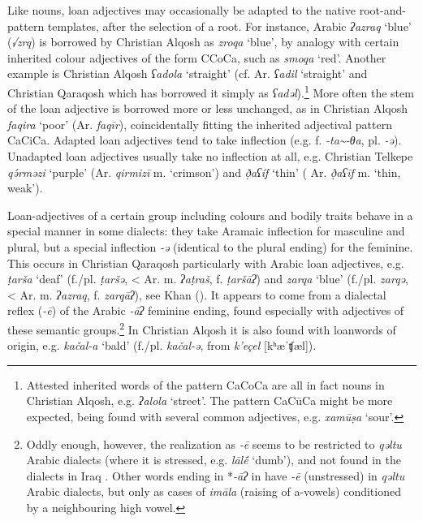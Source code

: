 \documentclass[output=paper]{langsci/langscibook}
\begin{document}
Like nouns, loan adjectives may occasionally be adapted to the native {root-and-pattern} templates, after the selection of a {root}. For instance, Arabic \textit{ʔazraq} ‘blue’ (\textit{√zrq}) is borrowed by Christian Alqosh as \textit{zroqa} ‘blue’, by {analogy} with certain inherited colour adjectives of the form CCoCa, such as \textit{smoqa} ‘red’. Another example is Christian Alqosh \textit{ʕadola} ‘straight’ (cf.  Ar. \textit{ʕadil} ‘straight’ and Christian Qaraqosh which has borrowed it simply as \textit{ʕadəl}).\footnote{Attested inherited words of the pattern CaCoCa are all in fact nouns in Christian Alqosh, e.g. \textit{ʔalola} ‘street’. The pattern CaCūCa might be more expected, being found with several common adjectives, e.g. \textit{xamūṣa} ‘sour’.} More often the {stem} of the loan adjective is borrowed more or less unchanged, as in Christian Alqosh \textit{faqira} ‘poor’ (Ar. \textit{faqīr}), coincidentally fitting the inherited adjectival pattern CaCiCa. Adapted loan adjectives tend to take  {inflection} (e.g. f. \textit{{}-ta{\textasciitilde}-θa}, pl. \textit{{}-ə}). Unadapted loan adjectives usually take no {inflection} at all, e.g. Christian Telkepe \textit{qə́rməzi} ‘purple’ (Ar. \textit{qirmizī} m. ‘crimson’) and \textit{ð̣aʕíf} ‘thin’ ( Ar. \textit{ð̣aʕīf} m. ‘thin, weak’).

Loan-adjectives of a certain group including colours and bodily traits behave in a special manner in some  dialects: they take Aramaic {inflection} for masculine and plural, but a special {inflection} \textit{\nobreakdash-ə} (identical to the plural ending) for the feminine. This occurs in Christian Qaraqosh particularly with Arabic loan adjectives, e.g. \textit{ṭarša} ‘deaf’ (f./pl. \textit{ṭaršə}, < Ar. m. \textit{ʔaṭraš}, f. \textit{ṭaršāʔ}) and \textit{zarqa} ‘blue’ (f./pl. \textit{zarqə}, < Ar. m. \textit{ʔazraq}, f. \textit{zarqāʔ}), see Khan (\citeyear[219]{Khan2002}). It appears to come from a dialectal reflex (\textit{\nobreakdash-ē}) of the Arabic \textit{\nobreakdash-āʔ} feminine ending, found especially with adjectives of these semantic groups.\footnote{Oddly enough, however, the realization as \textit{-ē} seems to be restricted to  \textit{qəltu} Arabic dialects (where it is stressed, e.g.  \textit{lāl\'{ē}} ‘dumb’), and not found in the dialects in Iraq \citep[76]{Jastrow1978}. Other words ending in *\textit{{}-āʔ} in have \textit{{}-ē} (unstressed) in \textit{qəltu} Arabic dialects, but only as cases of \textit{imāla} (raising of a-vowels) conditioned by a neighbouring high vowel.}  In Christian Alqosh it is also found with {loanwords} of  origin, e.g. \textit{kačal-a} ‘bald’ (f./pl. \textit{kačal\nobreakdash-ə}, from  \textit{k’eçel} [kʰæˈʧæl]).
\end{document}

